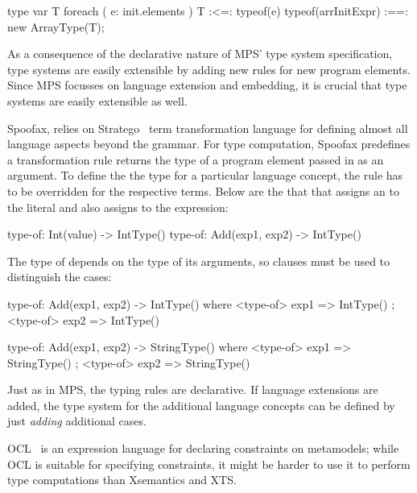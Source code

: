 \begin{code} 
type var T
foreach ( e: init.elements ) T :<=: typeof(e)
typeof(arrInitExpr) :==: new ArrayType(T);
\end{code}

As a consequence of the declarative nature of MPS' type system specification,
type systems are easily extensible by adding new rules for new program elements.
Since MPS focusses on language extension and embedding, it is crucial that type
systems are easily extensible as well.


Spoofax, relies on Stratego~\cite{Stratego2008} term transformation language for
defining almost all language aspects beyond the grammar. For type computation,
Spoofax predefines a transformation rule  returns the type of a
program element passed in as an argument. To define the the type for a
particular language concept, the  rule has to be overridden for the
respective terms. Below are the that that assigns an  to the
 literal and also assigns  to the  expression:

\begin{code}
  type-of: Int(value) -> IntType()
  type-of: Add(exp1, exp2) -> IntType()
\end{code}

The type of  depends on the type of its arguments, so  clauses
must be used to distinguish the cases:

\begin{code}
  type-of:
    Add(exp1, exp2) -> IntType()
    where <type-of> exp1 => IntType() ;
          <type-of> exp2 => IntType()

  type-of:
    Add(exp1, exp2) -> StringType()
    where <type-of> exp1 => StringType() ;
          <type-of> exp2 => StringType()
\end{code}

Just as in MPS, the typing rules are declarative. If language extensions are
added, the type system for the additional language concepts can be defined by
just \emph{adding} additional  cases.










OCL~\cite{WarmerKleppe99,OCLOMG} is an expression language for declaring
constraints on metamodels; while OCL is suitable for specifying constraints, it
might be harder to use it to perform type computations than Xsemantics and XTS.

